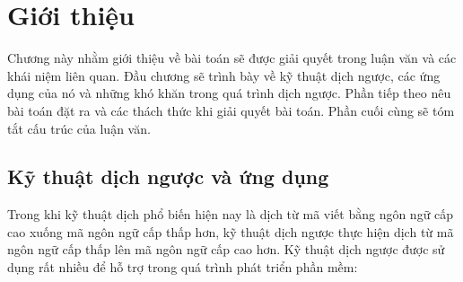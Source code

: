 \chapter{Giới thiệu}
\label{sec:gioithieu}


Chương này nhằm giới thiệu về bài toán sẽ được giải quyết trong luận văn và các khái niệm liên quan. Đầu chương sẽ trình bày về kỹ thuật dịch ngược, các ứng dụng của nó và những khó khăn trong quá trình dịch ngược. Phần tiếp theo nêu bài toán đặt ra và các thách thức khi giải quyết bài toán. Phần cuối cùng sẽ tóm tắt cấu trúc của luận văn.

\section{Kỹ thuật dịch ngược và ứng dụng}
Trong khi kỹ thuật dịch phổ biến hiện nay là dịch từ mã viết bằng ngôn ngữ cấp cao xuống mã ngôn ngữ cấp thấp hơn, kỹ thuật dịch ngược thực hiện dịch từ mã ngôn ngữ cấp thấp lên mã ngôn ngữ cấp cao hơn. Kỹ thuật dịch ngược được sử dụng rất nhiều để hỗ trợ trong quá trình phát triển phần mềm:

